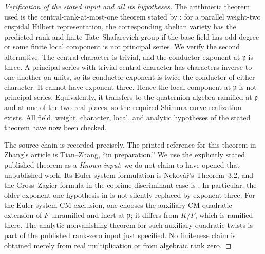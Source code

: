 \begin{proof}[Verification of the stated input and all its hypotheses]
The arithmetic theorem used is the central-rank-at-most-one theorem
stated by \citet[Theorem~4.3.2, p.~588]{AMZhang2010}: for a parallel
weight-two cuspidal Hilbert representation, the corresponding abelian
variety has the predicted rank and finite Tate--Shafarevich group if
the base field has odd degree or some finite local component is not
principal series. We verify the second alternative. The central character
is trivial, and the conductor exponent at $\mathfrak p$ is three.
A principal series with trivial central character has characters inverse
to one another on units, so its conductor exponent is twice the conductor
of either character. It cannot have exponent three. Hence the local
component at $\mathfrak p$ is not principal series. Equivalently, it
transfers to the quaternion algebra ramified at $\mathfrak p$ and at
one of the two real places, so the required Shimura-curve realization
exists. All field, weight, character, local, and analytic hypotheses of
the stated theorem have now been checked.

The source chain is recorded precisely. The printed reference for this
theorem in Zhang's article is Tian--Zhang, ``in preparation.'' We use the
explicitly stated published theorem as a \emph{Known input}; we do not
claim to have opened that unpublished work. Its Euler-system formulation
is Nekov\'a\v r's Theorem~3.2, and the Gross--Zagier formula in the
coprime-discriminant case is \citet[Theorem~6.1, p.~203]{AMZhang2004}.
In particular, the older exponent-one hypothesis in
\citet[Theorem~A]{AMZhang2001} is not silently replaced by exponent three.
For the Euler-system CM exclusion, one chooses the auxiliary CM quadratic
extension of $F$ unramified and inert at $\mathfrak p$; it differs from
$K/F$, which is ramified there. The analytic nonvanishing theorem for
such auxiliary quadratic twists is part of the published rank-zero
input just specified. No finiteness claim is obtained merely from real
multiplication or from algebraic rank zero.
\end{proof}


